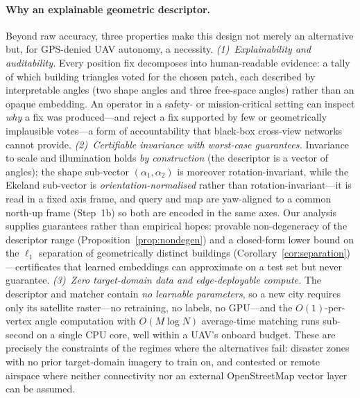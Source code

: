 \documentclass[10pt]{article}
\theoremstyle{plain}
\theoremstyle{definition}
\begin{document}
\paragraph{Why an explainable geometric descriptor.}
Beyond raw accuracy, three properties make this design not merely an alternative
but, for GPS-denied UAV autonomy, a necessity.
\emph{(1)~Explainability and auditability.}
Every position fix decomposes into human-readable evidence: a tally of which
building triangles voted for the chosen patch, each described by interpretable
angles (two shape angles and three free-space angles) rather than an opaque
embedding.
An operator in a safety- or mission-critical setting can inspect \emph{why} a
fix was produced---and reject a fix supported by few or geometrically
implausible votes---a form of accountability that black-box cross-view networks
cannot provide.
\emph{(2)~Certifiable invariance with worst-case guarantees.}
Invariance to scale and illumination holds \emph{by construction} (the descriptor
is a vector of angles); the shape sub-vector $(\alpha_1,\alpha_2)$ is moreover
rotation-invariant, while the Ekeland sub-vector is \emph{orientation-normalised}
rather than rotation-invariant---it is read in a fixed axis frame, and query and
map are yaw-aligned to a common north-up frame (Step~1b) so both are encoded in
the same axes. Our analysis supplies guarantees rather than empirical hopes:
provable non-degeneracy of the descriptor range
(Proposition~\ref{prop:nondegen}) and a closed-form lower bound on the $\ell_1$
separation of geometrically distinct buildings
(Corollary~\ref{cor:separation})---certificates that learned embeddings can
approximate on a test set but never guarantee.
\emph{(3)~Zero target-domain data and edge-deployable compute.}
The descriptor and matcher contain \emph{no learnable parameters}, so a new
city requires only its satellite raster---no retraining, no labels, no GPU---and
the $O(1)$-per-vertex angle computation with $O(M\log N)$ average-time matching
runs sub-second on a single CPU core, well within a UAV's onboard budget.
These are precisely the constraints of the regimes where the alternatives fail:
disaster zones with no prior target-domain imagery to train on, and contested
or remote airspace where neither connectivity nor an external OpenStreetMap
vector layer can be assumed.
\end{document}
